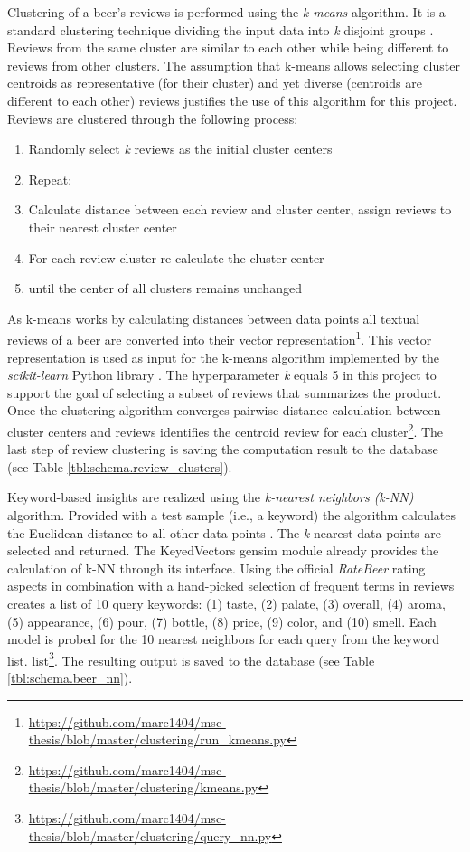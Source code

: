 Clustering of a beer's reviews is performed using the \textit{k-means} algorithm.
It is a standard clustering technique dividing the input data into \textit{k} disjoint groups \cite{Manning2009}.
Reviews from the same cluster are similar to each other while being different to reviews from other clusters.
The assumption that k-means allows selecting cluster centroids as representative (for their cluster) and yet diverse (centroids are different to each other) reviews justifies the use of this algorithm for this project.
Reviews are clustered through the following process:
\begin{enumerate}
	\item Randomly select \textit{k} reviews as the initial cluster centers
	\item Repeat:
	\item Calculate distance between each review and cluster center, assign reviews to their nearest cluster center
	\item For each review cluster re-calculate the cluster center
	\item until the center of all clusters remains unchanged
\end{enumerate}

As k-means works by calculating distances between data points all textual reviews of a beer are converted into their vector representation\footnote{\url{https://github.com/marc1404/msc-thesis/blob/master/clustering/run_kmeans.py}}.
This vector representation is used as input for the k-means algorithm implemented by the \textit{scikit-learn} Python library \cite{Pedregosa2012}.
The hyperparameter \textit{k} equals 5 in this project to support the goal of selecting a subset of reviews that summarizes the product.
Once the clustering algorithm converges pairwise distance calculation between cluster centers and reviews identifies the centroid review for each cluster\footnote{\url{https://github.com/marc1404/msc-thesis/blob/master/clustering/kmeans.py}}.
The last step of review clustering is saving the computation result to the database (see Table \ref{tbl:schema.review_clusters}).

Keyword-based insights are realized using the \textit{k-nearest neighbors (k-NN)} algorithm.
Provided with a test sample (i.e., a keyword) the algorithm calculates the Euclidean distance to all other data points \cite{Peterson2009}.
The \textit{k} nearest data points are selected and returned.
The KeyedVectors gensim module already provides the calculation of k-NN through its interface.
Using the official \textit{RateBeer} rating aspects in combination with a hand-picked selection of frequent terms in reviews creates a list of 10 query keywords: (1) taste, (2) palate, (3) overall, (4) aroma, (5) appearance, (6) pour, (7) bottle, (8) price, (9) color, and (10) smell.
Each model is probed for the 10 nearest neighbors for each query from the keyword list. list\footnote{\url{https://github.com/marc1404/msc-thesis/blob/master/clustering/query_nn.py}}.
The resulting output is saved to the database (see Table \ref{tbl:schema.beer_nn}).